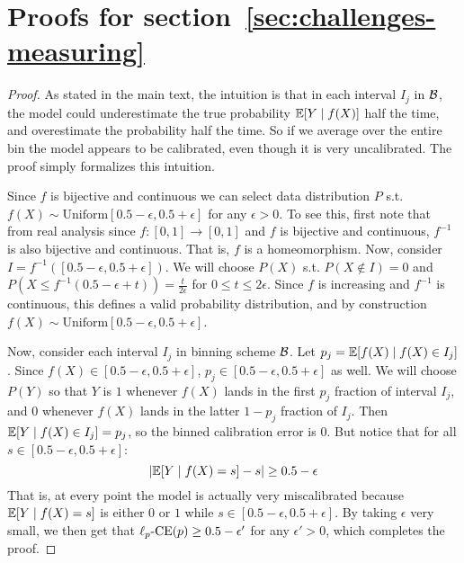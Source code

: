 \section{Proofs for section~\ref{sec:challenges-measuring}}
\label{sec:appendix-platt-not-calibrated}


\continuousNotCalibrated*

\begin{proof}
As stated in the main text, the intuition is that in each interval $I_j$ in $\mathcal{B}{}$, the model could underestimate the true probability $\mathbb{E}[Y \mid f(X)]$ half the time, and overestimate the probability half the time. So if we average over the entire bin the model appears to be calibrated, even though it is very uncalibrated. The proof simply formalizes this intuition.

Since $f$ is bijective and continuous we can select data distribution $P$ s.t. $f(X) \sim \mbox{Uniform}[0.5 - \epsilon, 0.5 + \epsilon]$ for any $\epsilon > 0$. To see this, first note that from real analysis since $f : [0, 1] \to [0, 1]$ and $f$ is bijective and continuous, $f^{-1}$ is also bijective and continuous. That is, $f$ is a homeomorphism. Now, consider $I = f^{-1}([0.5 - \epsilon, 0.5 + \epsilon])$. We will choose $P(X)$ s.t. $P(X \not\in I) = 0$ and $P(X \leq f^{-1}(0.5 - \epsilon + t)) = \frac{t}{2\epsilon}$ for $0 \leq t \leq 2 \epsilon$. Since $f$ is increasing and $f^{-1}$ is continuous, this defines a valid probability distribution, and by construction $f(X) \sim \mbox{Uniform}[0.5 - \epsilon, 0.5 + \epsilon]$.

Now, consider each interval $I_j$ in binning scheme $\mathcal{B}{}$. Let $p_j = \mathbb{E}[f(X) \mid f(X) \in I_j]$. Since $f(X) \in [0.5 - \epsilon, 0.5 + \epsilon]$, $p_j \in [0.5 - \epsilon, 0.5 + \epsilon]$ as well. We will choose $P(Y)$ so that $Y$ is $1$ whenever $f(X)$ lands in the first $p_j$ fraction of interval $I_j$, and $0$ whenever $f(X)$ lands in the latter $1 - p_j$ fraction of $I_j$. Then $\mathbb{E}[Y \mid f(X) \in I_j] = p_j$, so the binned calibration error is 0. But notice that for all $s \in [0.5 - \epsilon, 0.5 + \epsilon]$:
\[ \lvert \mathbb{E}[Y \mid f(X) = s] - s \rvert \geq 0.5 - \epsilon \]
That is, at every point the model is actually very miscalibrated because $\mathbb{E}[Y \mid f(X) = s]$ is either $0$ or $1$ while $s \in [0.5 - \epsilon, 0.5 + \epsilon]$. By taking $\epsilon$ very small, we then get that $\ell_p\mbox{-CE}(p) \geq 0.5 - \epsilon'$ for any $\epsilon' > 0$, which completes the proof.
\end{proof}


